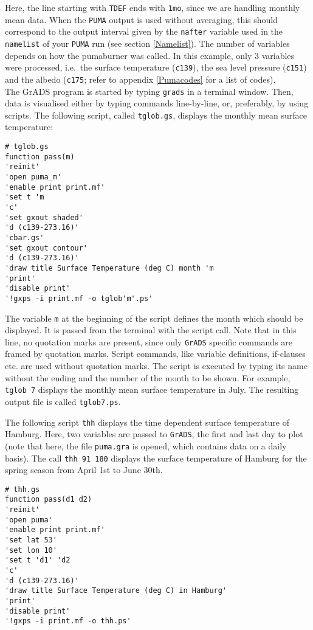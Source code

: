 Here, the line starting with \verb/TDEF/ ends with \verb/1mo/, since
we are handling monthly mean data. When the \verb/PUMA/ output is used
without averaging, this should correspond to the output interval given
by the \verb#nafter# variable used in the \verb#namelist# of your \verb#PUMA#
run (see section \ref{Namelist}). The number of variables
depends on how the pumaburner was
called. In this example, only 3 variables were processed, i.e.\ the
surface temperature (\verb/c139/), the sea level pressure
(\verb/c151/) and the albedo (\verb/c175/; refer to appendix
\ref{Pumacodes} for a list of codes).
\\
The GrADS program is started by typing \verb/grads/ in a terminal window. Then, data is visualised either by typing commands line-by-line, or, preferably, by using scripts. The following script, called \verb/tglob.gs/, displays the monthly mean surface temperature:
\begin{verbatim}
# tglob.gs
function pass(m)
'reinit'
'open puma_m'
'enable print print.mf'
'set t 'm
'c'
'set gxout shaded'
'd (c139-273.16)'
'cbar.gs'
'set gxout contour'
'd (c139-273.16)'
'draw title Surface Temperature (deg C) month 'm
'print'
'disable print'
'!gxps -i print.mf -o tglob'm'.ps'
\end{verbatim}
The variable \verb/m/ at the beginning of the script defines the month which should be displayed. It is passed from the terminal with the script call. Note that in this line, no quotation marks are present, since only \verb/GrADS/ specific commands are framed by quotation marks. Script commands, like variable definitions, if-clauses etc. are used without quotation marks. The script is executed by typing its name without the ending and the number of the month to be shown. For example, \verb/tglob 7/ displays the monthly mean surface temperature in July. The resulting output file is called \verb/tglob7.ps/. 
\par
\vspace{3mm}
The following script \verb/thh/ displays the time dependent surface temperature of Hamburg. Here, two variables are passed to \verb/GrADS/, the first and last day to plot (note that here, the file \verb/puma.gra/ is opened, which contains data on a daily basis). The call \verb/thh 91 180/ displays the surface temperature of Hamburg for the spring season from April 1st to June 30th.

\begin{verbatim}
# thh.gs
function pass(d1 d2)
'reinit'
'open puma'
'enable print print.mf'
'set lat 53'
'set lon 10'
'set t 'd1' 'd2
'c'
'd (c139-273.16)'
'draw title Surface Temperature (deg C) in Hamburg'
'print'
'disable print'
'!gxps -i print.mf -o thh.ps'
\end{verbatim}

